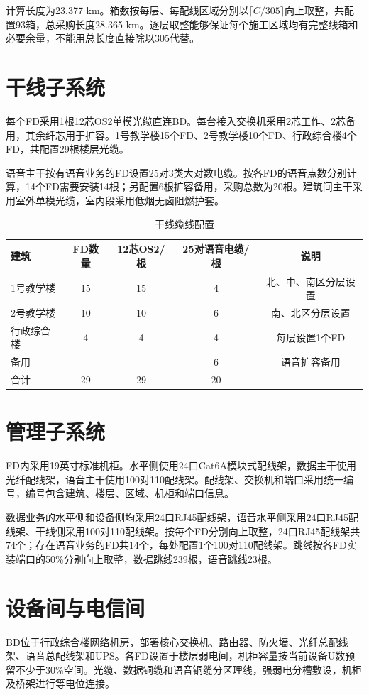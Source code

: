 \documentclass[UTF8,zihao=-4,openany]{ctexrep}
\begin{document}
计算长度为23.377 km。箱数按每层、每配线区域分别以$\lceil C/305\rceil$向上取整，共配置93箱，总采购长度28.365 km。逐层取整能够保证每个施工区域均有完整线箱和必要余量，不能用总长度直接除以305代替。

\section{干线子系统}
每个FD采用1根12芯OS2单模光缆直连BD。每台接入交换机采用2芯工作、2芯备用，其余纤芯用于扩容。1号教学楼15个FD、2号教学楼10个FD、行政综合楼4个FD，共配置29根楼层光缆。

语音主干按有语音业务的FD设置25对3类大对数电缆。按各FD的语音点数分别计算，14个FD需要安装14根；另配置6根扩容备用，采购总数为20根。建筑间主干采用室外单模光缆，室内段采用低烟无卤阻燃护套。

\begin{table}[H]
\centering
\caption{干线缆线配置}
\begin{tabular}{lcccc}
\toprule
建筑&FD数量&12芯OS2/根&25对语音电缆/根&说明\\
\midrule
1号教学楼&15&15&4&北、中、南区分层设置\\
2号教学楼&10&10&6&南、北区分层设置\\
行政综合楼&4&4&4&每层设置1个FD\\
备用&--&--&6&语音扩容备用\\
\midrule
合计&29&29&20&\\
\bottomrule
\end{tabular}
\end{table}

\section{管理子系统}
FD内采用19英寸标准机柜。水平侧使用24口Cat6A模块式配线架，数据主干使用光纤配线架，语音主干使用100对110配线架。配线架、交换机和端口采用统一编号，编号包含建筑、楼层、区域、机柜和端口信息。

数据业务的水平侧和设备侧均采用24口RJ45配线架，语音水平侧采用24口RJ45配线架、干线侧采用100对110配线架。按每个FD分别向上取整，24口RJ45配线架共74个；存在语音业务的FD共14个，每处配置1个100对110配线架。跳线按各FD实装端口的50\%分别向上取整，数据跳线239根，语音跳线23根。

\section{设备间与电信间}
BD位于行政综合楼网络机房，部署核心交换机、路由器、防火墙、光纤总配线架、语音总配线架和UPS。各FD设置于楼层弱电间，机柜容量按当前设备U数预留不少于30\%空间。光缆、数据铜缆和语音铜缆分区理线，强弱电分槽敷设，机柜及桥架进行等电位连接。
\end{document}
